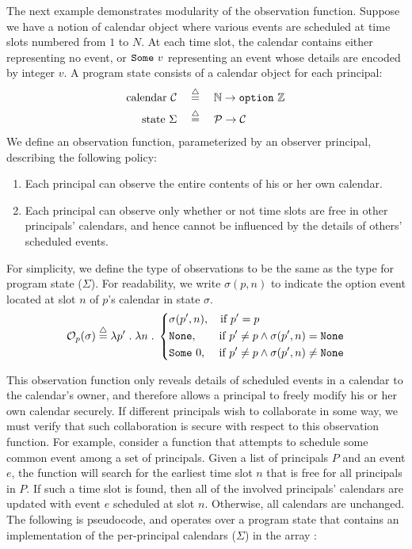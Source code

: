 The next example demonstrates modularity of the observation
function. Suppose we have a notion of calendar object where 
various events are scheduled at time slots numbered from $1$
to $N$. At each time slot, the calendar contains either 
\none{} representing no event, or $\text{\tt{Some}} \,\, v$
representing an event whose details are encoded by integer $v$. 
A program state consists of a calendar object for each principal:
{\small\begin{align*}
\text{calendar } \mathcal{C} \quad & \stackrel{\triangle}{=} \quad \mathbb{N} \to \text{\tt{option}} \,\, \mathbb{Z} \\
\text{state } \Sigma \quad & \stackrel{\triangle}{=} \quad \mathcal{P} \to \mathcal{C}
\end{align*}}%
\noindent{}We define an observation function, parameterized by an
observer principal, describing the following policy:
\begin{enumerate}
\item Each principal can observe the entire contents of his or her own calendar.
\item Each principal can observe only whether or not time slots are
free in other principals' calendars, and hence cannot be influenced by the
details of others' scheduled events.
\end{enumerate}
For simplicity, we define the type of observations to be the same as the type
for program state ($\Sigma$). For readability, we write $\sigma(p,n)$ to
indicate the option event located at slot $n$ of $p$'s calendar in state $\sigma$.
{\small\begin{align*}
\mathcal{O}_{p}(\sigma) \stackrel{\triangle}{=} \lambda p' \hspace{1mm} . \hspace{1mm} \lambda n \hspace{1mm} . \hspace{1mm}  
\left\{
\begin{aligned}
&\sigma(p',n), \quad \text{if } p' = p \\
&\text{\tt{None}}{}, \quad \quad \text{if } p' \neq p \land \sigma(p',n) = \text{\tt{None}}{} \\
&\text{\tt{Some}} \,\, 0, \quad \, \text{if } p' \neq p \land \sigma(p',n) \neq \text{\tt{None}}{}
\end{aligned}\right.
\end{align*}}%

This observation function only reveals details of scheduled events in
a calendar to the calendar's owner, and therefore allows a principal
to freely modify his or her own calendar securely. If different principals
wish to collaborate in some way, we must verify that such collaboration is 
secure with respect to this observation function. For example,
consider a function  that attempts to
schedule some common event among a set of principals.
Given a list of principals $P$ and an event $e$, the function
will search for the earliest time slot $n$ that is free for all
principals in $P$. If such a time slot is found, then all
of the involved principals' calendars are updated with
event $e$ scheduled at slot $n$. Otherwise, all calendars are 
unchanged. The following is pseudocode, and operates over
a program state that contains an implementation of the
per-principal calendars ($\Sigma$) in the array :

